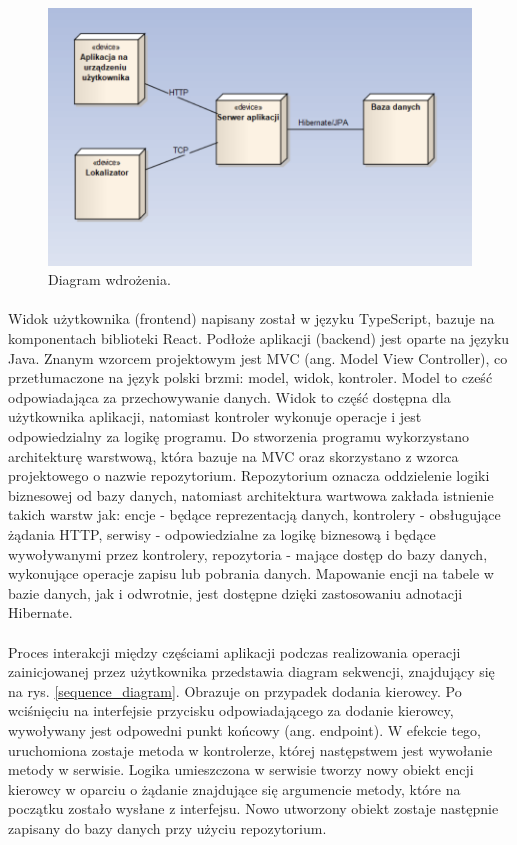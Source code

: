 \begin{figure}
	\centering
	\includegraphics[width=1\textwidth]{./graf/deployment_diagram.png}
	\caption{Diagram wdrożenia.}
	\label{deployment_diagram}
\end{figure}

\paragraph{}
Widok użytkownika (frontend) napisany został w języku TypeScript, bazuje na komponentach biblioteki React. Podłoże aplikacji (backend) jest oparte na języku Java. Znanym wzorcem projektowym jest MVC (ang. Model View Controller), co przetłumaczone na język polski brzmi: model, widok, kontroler. Model to cześć odpowiadająca za przechowywanie danych. Widok to część dostępna dla użytkownika aplikacji, natomiast kontroler wykonuje operacje i jest odpowiedzialny za logikę programu. Do stworzenia programu wykorzystano architekturę warstwową, która bazuje na MVC oraz skorzystano z wzorca projektowego o nazwie repozytorium. Repozytorium oznacza oddzielenie logiki biznesowej od bazy danych, natomiast architektura wartwowa zakłada istnienie takich warstw jak: encje - będące reprezentacją danych, kontrolery - obsługujące żądania HTTP, serwisy - odpowiedzialne za logikę biznesową i będące wywoływanymi przez kontrolery, repozytoria - mające dostęp do bazy danych, wykonujące operacje zapisu lub pobrania danych. Mapowanie encji na tabele w bazie danych, jak i odwrotnie, jest dostępne dzięki zastosowaniu adnotacji Hibernate.

\paragraph{}
Proces interakcji między częściami aplikacji podczas realizowania operacji zainicjowanej przez użytkownika przedstawia diagram sekwencji, znajdujący się na rys. \ref{sequence_diagram}. Obrazuje on przypadek dodania kierowcy. Po wciśnięciu na interfejsie przycisku odpowiadającego za dodanie kierowcy, wywoływany jest odpowedni punkt końcowy (ang. endpoint). W efekcie tego, uruchomiona zostaje metoda w kontrolerze, której następstwem jest wywołanie metody w serwisie. Logika umieszczona w serwisie tworzy nowy obiekt encji kierowcy w oparciu o żądanie znajdujące się argumencie metody, które na początku zostało wysłane z interfejsu. Nowo utworzony obiekt zostaje następnie zapisany do bazy danych przy użyciu repozytorium.

